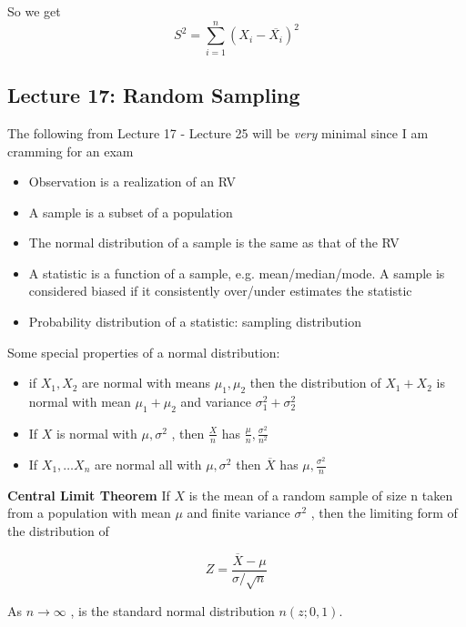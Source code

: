 \documentclass[10pt]{article}
\begin{document}
So we get 
\begin{equation}
	S^2 = \sum^n_{i=1} (X_i - \overline{X_i})^2
\end{equation}




\subsection{Lecture 17: Random Sampling}
\begin{blockquote}
	The following from Lecture 17 - Lecture 25 will be \textit{very} minimal since I am cramming for an exam
\end{blockquote}


\begin{itemize}
	\item Observation is a realization of an RV
	\item A sample is a subset of a population
	\item The normal distribution of a sample is the same as that of the RV
	\item A statistic is a function of a sample, e.g. mean/median/mode. A sample is considered biased if it consistently over/under estimates the statistic
	\item Probability distribution of a statistic: sampling distribution
\end{itemize}

Some special properties of a normal distribution:
\begin{itemize}
	\item if $ X_1, X_2 $  are normal with means $ \mu_1, \mu_2 $ then the distribution of $ X_1 + X_2 $  is normal with mean $ \mu_1 + \mu_2 $ and variance $ \sigma_1^2 + \sigma_2^2 $ 
	\item If $ X $  is normal with $ \mu, \sigma^2 $ , then $ \frac{X}{n} $ has $ \frac{\mu}{n}, \frac{\sigma^2}{n^2} $ 
	\item If $ X_1, \ldots X_n $ are normal all with $ \mu, \sigma^2 $ then $ \overline{X} $ has $ \mu, \frac{\sigma^2}{n} $ 
\end{itemize}

\begin{definition}
	\textbf{Central Limit Theorem} If $X$ is the mean of a random sample of size n taken from a population with mean $ \mu $  and finite variance $ \sigma^2 $ , then the limiting form of the distribution of

	\begin{equation}
	Z = \frac{\overline{X} - \mu}{\sigma/\sqrt{n}}
		\label{eq:286:central_limit_theorem}
	\end{equation}

	As $ n \rightarrow \infty $ , is the standard normal distribution $n(z; 0, 1)$.
\end{definition}
\end{document}
